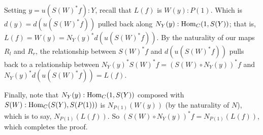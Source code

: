Setting $y = u(S(W)^* f) : Y$, recall that $L(f)$ is $W(y) : P(1)$. Which is $d(y) = d(u(S(W)^* f))$ pulled back along $N_Y(y) : \operatorname{Hom}_C(1, S(Y))$; that is, $L(f) = W(y) = N_Y(y)^* d(u(S(W)^* f))$. By the naturality of our maps $R_l$ and $R_r$, the relationship between $S(W)^*f$ and $d(u(S(W)^*f))$ pulls back to a relationship between $N_Y(y)^* S(W)^*f = (S(W) \circ N_Y(y))^* f$ and $N_Y(y)^* d(u(S(W)^*f)) = L(f)$.

Finally, note that $N_Y(y) : \operatorname{Hom}_C(1, S(Y))$ composed with $S(W) : \operatorname{Hom}_C(S(Y), S(P(1)))$ is $N_{P(1)}(W(y))$ (by the naturality of $N$), which is to say, $N_{P(1)}(L(f))$. So $(S(W) \circ N_Y(y))^* f = N_{P(1)}(L(f))$, which completes the proof.